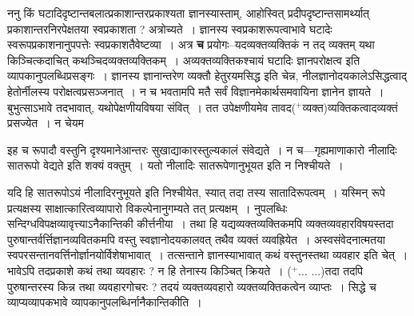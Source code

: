 \documentclass[article,12pt,a4paper]{memoir}
\newcommand{\add}[1]{($^{+}$#1)}
\begin{document}
	  \pstart ननु किं घटादिदृष्टान्तबलात्प्रकाशान्तरप्रकाश्यता ज्ञानस्यास्ताम्, आहोस्वित् प्रदीपदृष्टान्तसामर्थ्यात् प्रकाशान्तरनिरपेक्षतया स्वप्रकाशता ? अत्रोच्यते । ज्ञानस्य स्वप्रकाशरूपत्वाभावे घटादेः स्वरूपप्रकाशनानुपपत्तेः स्वप्रकाशतैवेष्टव्या । अत्र \textbf{च} प्रयोगः--यदव्यक्तव्यक्तिकं न तद् व्यक्तम् यथा किञ्चित्कदाचित् कथञ्चिदव्यक्तव्यक्तिकम् । अव्यक्तव्यक्तिकश्चायं घटादिः ज्ञानपरोक्षत्व इति व्यापकानुपलब्धिप्रसङ्गः । ज्ञानस्य ज्ञानान्तरेण व्यक्तौ हेतुरयमसिद्ध इति चेन्न, नीलज्ञानोदयकालेऽसिद्धत्वाद् हेतोर्नीलस्य परोक्षत्वप्रसञ्जनात् । न च भवतामपि मतै सर्वं विज्ञानमेकार्थसमवायिना ज्ञानेन ज्ञायते । बुभुत्साऽभावे तदभावात्, यथोपेक्षणीयविषया संवित् । तत उपेक्षणीयमेव तावद\add{व्यक्त}व्यक्तिकत्वादव्यक्तं प्रसज्येत । न चेयम  \leavevmode{} 
	  
	इह च रूपादौ वस्तुनि दृश्यमानेआन्तरः सुखाद्याकारस्तुल्यकालं संवेद्यते । न च—गृह्यमाणाकारो नीलादिः सातरूपो वेद्यते इति शक्यं वक्तुम् । यतो नीलादिः सातरूपेणानुभूयत इति न निश्चीयते ।  
	  
	यदि हि सातरूपोऽयं नीलादिरनुभूयते इति निश्चीयेत, स्यात् तदा तस्य सातादिरूपत्वम् । यस्मिन् रूपे प्रत्यक्षस्य साक्षात्कारित्वव्यापारो विकल्पेनानुगम्यते तत् प्रत्यक्षम् । नुपलब्धिः सन्दिग्धविपक्षव्यावृत्त्याऽनैकान्तिकी कीर्त्तनीया । \leavevmode{} तथा हि यद्यव्यक्तव्यक्तिकमपि व्यक्तव्यवहारविषयस्तदा पुरुषान्तर्वर्त्तिज्ञानव्यवितकमपि वस्तु स्वज्ञानोदयकालवत् तथैव व्यक्तं व्यवह्रियेत । अस्वसंवेदनात्मतया स्वपरसन्तानवर्त्तिनोर्ज्ञानयोर्विशेषाभावात् । तत्सन्ताने ज्ञानस्याभावात् कथं वस्तुनस्तथा व्यवहार इति चेत् । भावेऽपि तदप्रकाशे कथं तथा व्यवहारः ? न हि तेनास्य किञ्चित् क्रियते । \add{... ...}तदा तदपि पुरुषान्तरस्य किन्न तथा व्यवहारगोचरः ? तदयं व्यक्तव्यवहारो व्यक्तव्यक्तिकत्वेन व्याप्तः । सिद्धे च व्याप्यव्यापकभावे व्यापकानुपलब्धिर्नानैकान्तिकीति ।
	\pend
      
\end{document}
